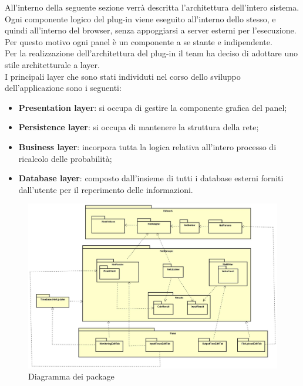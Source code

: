 \pagebreak
{}
All'interno della seguente sezione verrà descritta l'architettura dell'intero sistema.\\
Ogni componente logico del plug-in viene eseguito all'interno dello stesso, e quindi all'interno del browser, senza appoggiarsi a server esterni per l'esecuzione. Per questo motivo ogni panel è un componente a se stante e indipendente. \\
Per la realizzazione dell'architettura del plug-in il team ha deciso di adottare uno stile architetturale a layer.\\
I principali layer che sono stati individuti nel corso dello sviluppo dell'applicazione sono i seguenti:
\begin{itemize}
	\item{\textbf{Presentation layer}: si occupa di gestire la componente grafica del panel;}
	\item{\textbf{Persistence layer}: si occupa di mantenere la struttura della rete;}
	\item{\textbf{Business layer}: incorpora tutta la logica relativa all’intero processo di ricalcolo delle probabilità;}
	\item{\textbf{Database layer}: composto dall’insieme di tutti i database esterni forniti dall’utente per il reperimento delle informazioni.}
\end{itemize}
\begin{figure} [H]
	\centering
	\includegraphics[scale=0.25]{Img/Diagramma_Package}
	\caption{Diagramma dei package}\label{}
\end{figure}
